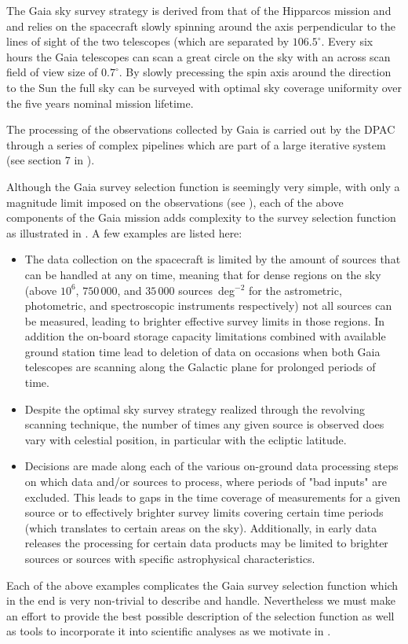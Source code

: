 The Gaia sky survey strategy is derived from that of the Hipparcos mission and and relies on the spacecraft slowly spinning around the axis perpendicular to the lines of sight of the two telescopes (which are separated by $106.5^\circ$. Every six hours the Gaia telescopes can scan a great circle on the sky with an across scan field of view size of $0.7^\circ$. By slowly precessing the spin axis around the direction to the Sun the full sky can be surveyed with optimal sky coverage uniformity over the five years nominal mission lifetime. 

The processing of the observations collected by Gaia is carried out by the DPAC through a series of complex pipelines which are part of a large iterative system (see section 7 in \cite{2016A&A...595A...1G}).

Although the Gaia survey selection function is seemingly very simple, with only a magnitude limit imposed on the observations (see ), each of the above components of the Gaia mission adds complexity to the survey selection function as illustrated in . A few examples are listed here:
\begin{itemize}
    \item The data collection on the spacecraft is limited by the amount of sources that can be handled at any on time, meaning that for dense regions on the sky (above $10^6$, $750\,000$, and $35\,000$ sources~deg$^{-2}$ for the astrometric, photometric, and spectroscopic instruments respectively) not all sources can be measured, leading to brighter effective survey limits in those regions. In addition the on-board storage capacity limitations combined with available ground station time lead to deletion of data on occasions when both Gaia telescopes are scanning along the Galactic plane for prolonged periods of time.
    \item Despite the optimal sky survey strategy realized through the revolving scanning technique, the number of times any given source is observed does vary with celestial position, in particular with the ecliptic latitude.
    \item Decisions are made along each of the various on-ground data processing steps on which data and/or sources to process, where periods of "bad inputs" are excluded. This leads to gaps in the time coverage of measurements for a given source or to effectively brighter survey limits covering certain time periods (which translates to certain areas on the sky). Additionally, in early data releases the processing for certain data products may be limited to brighter sources or sources with specific astrophysical characteristics.
\end{itemize}
Each of the above examples complicates the Gaia survey selection function which in the end is very non-trivial to describe and handle. Nevertheless we must make an effort to provide the best possible description of the selection function as well as tools to incorporate it into scientific analyses as we motivate in .

